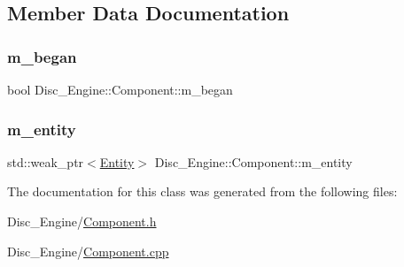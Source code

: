 \subsection{Member Data Documentation}
\mbox{\label{class_disc___engine_1_1_component_a93ac80d6d168cb71b3942e5aa01f0177}} 
\subsubsection{\texorpdfstring{m\+\_\+began}{m\_began}}
{\footnotesize\ttfamily bool Disc\+\_\+\+Engine\+::\+Component\+::m\+\_\+began\hspace{0.3cm}{\ttfamily [private]}}

\mbox{\label{class_disc___engine_1_1_component_aebc3183e7720ae37cc56f9d23c88a05f}} 
\subsubsection{\texorpdfstring{m\+\_\+entity}{m\_entity}}
{\footnotesize\ttfamily std\+::weak\+\_\+ptr$<$\mbox{\hyperlink{class_disc___engine_1_1_entity}{Entity}}$>$ Disc\+\_\+\+Engine\+::\+Component\+::m\+\_\+entity\hspace{0.3cm}{\ttfamily [private]}}



The documentation for this class was generated from the following files\+:\begin{DoxyCompactItemize}
\item 
Disc\+\_\+\+Engine/\mbox{\hyperlink{_component_8h}{Component.\+h}}\item 
Disc\+\_\+\+Engine/\mbox{\hyperlink{_component_8cpp}{Component.\+cpp}}\end{DoxyCompactItemize}
